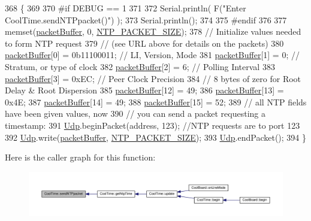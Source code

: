 \begin{DoxyCode}
368 \{
369 
370 \textcolor{preprocessor}{#if DEBUG == 1 }
371 
372     Serial.println( F(\textcolor{stringliteral}{"Enter CoolTime.sendNTPpacket()"}) );
373     Serial.println();
374 
375 \textcolor{preprocessor}{#endif}
376 
377     memset(\hyperlink{classCoolTime_a27e6abc82a5c2f72161956967005bec7}{packetBuffer}, 0, \hyperlink{CoolTime_8h_a56a6ea64006651b4f42adf713e244f06}{NTP\_PACKET\_SIZE});
378     \textcolor{comment}{// Initialize values needed to form NTP request}
379     \textcolor{comment}{// (see URL above for details on the packets)}
380     \hyperlink{classCoolTime_a27e6abc82a5c2f72161956967005bec7}{packetBuffer}[0] = 0b11100011;   \textcolor{comment}{// LI, Version, Mode}
381     \hyperlink{classCoolTime_a27e6abc82a5c2f72161956967005bec7}{packetBuffer}[1] = 0;     \textcolor{comment}{// Stratum, or type of clock}
382     \hyperlink{classCoolTime_a27e6abc82a5c2f72161956967005bec7}{packetBuffer}[2] = 6;     \textcolor{comment}{// Polling Interval}
383     \hyperlink{classCoolTime_a27e6abc82a5c2f72161956967005bec7}{packetBuffer}[3] = 0xEC;  \textcolor{comment}{// Peer Clock Precision}
384     \textcolor{comment}{// 8 bytes of zero for Root Delay & Root Dispersion}
385     \hyperlink{classCoolTime_a27e6abc82a5c2f72161956967005bec7}{packetBuffer}[12]  = 49;
386     \hyperlink{classCoolTime_a27e6abc82a5c2f72161956967005bec7}{packetBuffer}[13]  = 0x4E;
387     \hyperlink{classCoolTime_a27e6abc82a5c2f72161956967005bec7}{packetBuffer}[14]  = 49;
388     \hyperlink{classCoolTime_a27e6abc82a5c2f72161956967005bec7}{packetBuffer}[15]  = 52;
389     \textcolor{comment}{// all NTP fields have been given values, now}
390     \textcolor{comment}{// you can send a packet requesting a timestamp:                 }
391     \hyperlink{classCoolTime_a4e23216a8121ca79d0fb019f30884b92}{Udp}.beginPacket(address, 123); \textcolor{comment}{//NTP requests are to port 123}
392     \hyperlink{classCoolTime_a4e23216a8121ca79d0fb019f30884b92}{Udp}.write(\hyperlink{classCoolTime_a27e6abc82a5c2f72161956967005bec7}{packetBuffer}, \hyperlink{CoolTime_8h_a56a6ea64006651b4f42adf713e244f06}{NTP\_PACKET\_SIZE});
393     \hyperlink{classCoolTime_a4e23216a8121ca79d0fb019f30884b92}{Udp}.endPacket(); 
394 \}
\end{DoxyCode}
Here is the caller graph for this function\+:\nopagebreak
\begin{figure}[H]
\begin{center}
\leavevmode
\includegraphics[width=350pt]{classCoolTime_a236a38d120dc53bc67456d763838c5a1_icgraph}
\end{center}
\end{figure}
\mbox{\label{classCoolTime_ab81ea7fdaace111aa01cc1ec84c6d297}} 
